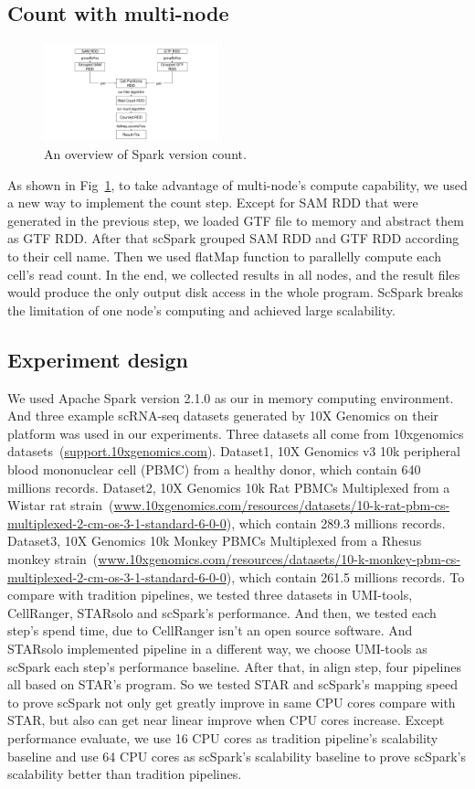 \documentclass[conference]{IEEEtran}
\begin{document}
\subsection{Count with multi-node}
\begin{figure}
	\includegraphics[width=0.45\textwidth]{Fig3.pdf}
	\caption{An overview of Spark version count.} \label{fig3}
\end{figure}
As shown in Fig~\ref{fig3}, to take advantage of multi-node's compute capability, we used a new way to implement the count step. 
Except for SAM RDD that were generated in the previous step, we loaded GTF file to memory and abstract them as GTF RDD. 
After that scSpark grouped SAM RDD and GTF RDD according to their cell name. 
Then we used flatMap function to parallelly compute each cell's read count. 
In the end, we collected results in all nodes, and the result files would produce the only output disk access in the whole program. 
ScSpark breaks the limitation of one node's computing and achieved large scalability. 

\subsection{Experiment design}
We used Apache Spark version 2.1.0 as our in memory computing environment.
And three example scRNA-seq datasets generated by 10X Genomics on their platform was used in our experiments.
Three datasets all come from 10xgenomics datasets~(\url{support.10xgenomics.com}).
Dataset1, 10X Genomics v3 10k peripheral blood mononuclear cell (PBMC) from a healthy donor, which contain 640 millions records.
Dataset2, 10X Genomics 10k Rat PBMCs Multiplexed from a  Wistar rat strain~(\url{www.10xgenomics.com/resources/datasets/10-k-rat-pbm-cs-multiplexed-2-cm-os-3-1-standard-6-0-0}), which contain 289.3 millions records.
Dataset3, 10X Genomics 10k Monkey PBMCs Multiplexed from a Rhesus monkey strain~(\url{www.10xgenomics.com/resources/datasets/10-k-monkey-pbm-cs-multiplexed-2-cm-os-3-1-standard-6-0-0}), which contain 261.5 millions records.
To compare with tradition pipelines, we tested three datasets in UMI-tools, CellRanger, STARsolo and scSpark's performance.
And then, we tested each step's spend time, due to CellRanger isn't an open source software.
And STARsolo implemented pipeline in a different way, we choose UMI-tools as scSpark each step's performance baseline.
After that, in align step, four pipelines all based on STAR's program.
So we tested STAR and scSpark's mapping speed to prove scSpark not only get greatly improve in same CPU cores compare with STAR, but also can get near linear improve when CPU cores increase.
Except performance evaluate, we use 16 CPU cores as tradition pipeline's scalability baseline and use 64 CPU cores as scSpark's scalability baseline to prove scSpark's scalability better than tradition pipelines.
\end{document}

